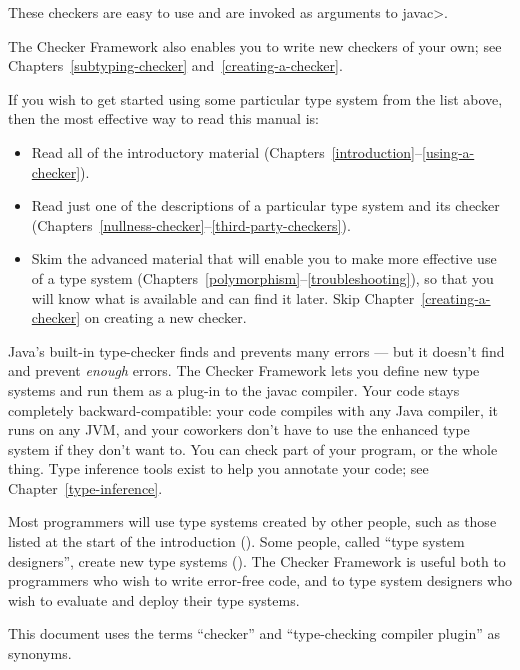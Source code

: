 \noindent
These checkers are easy to use and are invoked as arguments to \<javac>.


The Checker Framework also enables you to write new checkers of your
own; see Chapters~\ref{subtyping-checker} and~\ref{creating-a-checker}.



If you wish to get started using some particular type system from the list
above, then the most effective way to read this manual is:

\begin{itemize}
\item
  Read all of the introductory material
  (Chapters~\ref{introduction}--\ref{using-a-checker}).
\item
  Read just one of the descriptions of a particular type system and its
  checker (Chapters~\ref{nullness-checker}--\ref{third-party-checkers}).
\item
  Skim the advanced material that will enable you to make more effective
  use of a type system
  (Chapters~\ref{polymorphism}--\ref{troubleshooting}), so that you will
  know what is available and can find it later.  Skip
  Chapter~\ref{creating-a-checker} on creating a new checker.
\end{itemize}



Java's built-in type-checker finds and prevents many errors --- but it
doesn't find and prevent \emph{enough} errors.  The Checker Framework lets you
define new type systems and run them as a plug-in to the javac compiler.  Your
code stays completely backward-compatible:  your code compiles with any
Java compiler, it runs on any JVM, and your coworkers don't have to use the
enhanced type system if they don't want to.  You can check part of
your program, or the whole thing.  Type inference tools exist to help you annotate your
code; see Chapter~\ref{type-inference}.

Most programmers will use type systems created by other people, such as
those listed at the start of the introduction ().
Some people, called ``type system designers'', create new type systems
().
The Checker Framework is useful both to programmers who
wish to write error-free code, and to type system designers who wish to
evaluate and deploy their type systems.

This document uses the terms ``checker'' and ``type-checking compiler
plugin'' as synonyms.

